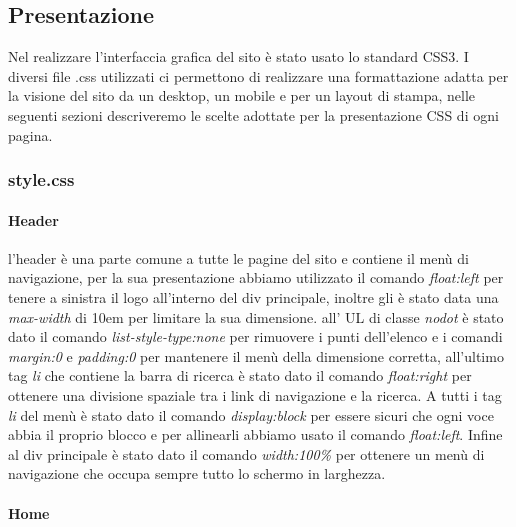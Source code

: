 \subsection{Presentazione}
Nel realizzare l'interfaccia grafica del sito è stato usato lo standard CSS3.\newline
I diversi file .css utilizzati ci permettono di realizzare una formattazione adatta per la visione del sito da un desktop, un mobile e per un layout di stampa, nelle seguenti sezioni descriveremo le scelte adottate per la presentazione CSS di ogni pagina.

\subsubsection{style.css}

\paragraph{Header} \mbox{}
l'header è una parte comune a tutte le pagine del sito e contiene il menù di navigazione, per la sua presentazione abbiamo utilizzato il comando \emph{float:left} per tenere a sinistra il logo all'interno del div principale, inoltre gli è stato data una \emph{max-width} di 10em per limitare la sua dimensione. all' UL di classe \emph{nodot} è stato dato il comando \emph{list-style-type:none} per rimuovere i punti dell'elenco e i comandi \emph{margin:0} e \emph{padding:0} per mantenere il menù della dimensione corretta, all'ultimo tag \emph{li} che contiene la barra di ricerca è stato dato il comando \emph{float:right} per ottenere una divisione spaziale tra i link di navigazione e la ricerca.
A tutti i tag \emph{li} del menù è stato dato il comando \emph{display:block} per essere sicuri che ogni voce abbia il proprio blocco e per allinearli abbiamo usato il comando \emph{float:left}.
Infine al div principale è stato dato il comando \emph{width:100\%} per ottenere un menù di navigazione che occupa sempre tutto lo schermo in larghezza.


\paragraph{Home} \mbox{}